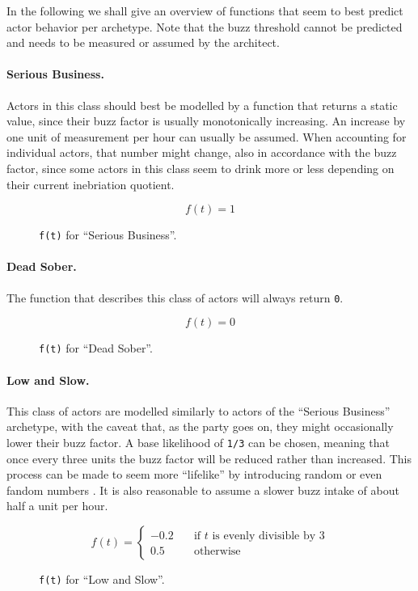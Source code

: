 \documentclass[twocolumn]{article}
\begin{document}
In the following we shall give an overview of functions that seem to best
predict actor behavior per archetype. Note that the buzz threshold cannot be
predicted and needs to be measured or assumed by the architect.

\paragraph{Serious Business.} Actors in this class should best be modelled by a
function that returns a static value, since their buzz factor is usually
monotonically increasing. An increase by one unit of measurement per hour can
usually be assumed. When accounting for individual actors, that number might
change, also in accordance with the buzz factor, since some actors in this class
seem to drink more or less depending on their current inebriation quotient.

\begin{figure}[H]
\[ f(t) = 1 \]
\caption{\texttt{f(t)} for “Serious Business”.}
\end{figure}

\paragraph{Dead Sober.} The function that describes this class of actors will
always return \texttt{0}.

\begin{figure}[H]
\[ f(t) = 0 \]
\caption{\texttt{f(t)} for “Dead Sober”.}
\end{figure}

\paragraph{Low and Slow.} This class of actors are modelled similarly to actors
of the “Serious Business” archetype, with the caveat that, as the party goes on,
they might occasionally lower their buzz factor. A base likelihood of
\texttt{1/3} can be chosen, meaning that once every three units the buzz
factor will be reduced rather than increased. This process can be made to
seem more “lifelike” by introducing random or even fandom numbers
\cite{fandom}. It is also reasonable to assume a slower buzz intake of about
half a unit per hour.

\begin{figure}[H]
\[ f(t) =
  \begin{cases}
    -0.2       & \quad \text{if } t \text{ is evenly divisible by 3}\\
    0.5        & \quad \text{otherwise}
  \end{cases}
\]
\caption{\texttt{f(t)} for “Low and Slow”.}
\end{figure}
\end{document}
